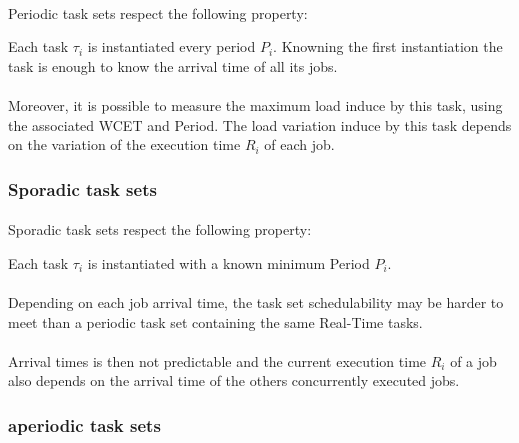 \paragraph{}
Periodic task sets respect the following property:\\
\begin{property}
Each task $\tau_{i}$ is instantiated every period $P_{i}$. Knowning the first instantiation the
task is enough to know the arrival time of all its jobs.
\end{property}

\paragraph{}
Moreover, it is possible to measure the maximum load induce by this task, using the associated WCET
and Period. The load variation induce by this task depends on the variation of the execution time
$R_{i}$ of each job.

\subsubsection{Sporadic task sets}

\paragraph{}
Sporadic task sets respect the following property:\\
\begin{property}
Each task $\tau_{i}$ is instantiated with a known minimum Period $P_{i}$.
\end{property}

\paragraph{}
Depending on each job arrival time, the task set schedulability may be harder to meet than a
periodic task set containing the same Real-Time tasks.

\paragraph{}
Arrival times is then not predictable and the current execution time $R_{i}$ of a job also depends
on the arrival time of the others concurrently executed jobs.

\subsubsection{aperiodic task sets}

